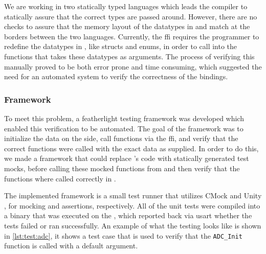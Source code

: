 We are working in two statically typed languages which leads the compiler to statically assure that the correct types are passed around.
However, there are no checks to assure that the memory layout of the datatypes in {\C} and {\rust} match at the borders between the two languages.
Currently, the {\rust} \gls{ffi} requires the programmer to redefine the {\C} datatypes in {\rust}, like structs and enums, in order to call into the {\C} functions that takes these datatypes as arguments.
The process of verifying this manually proved to be both error prone and time consuming, which suggested the need for an automated system to verify the correctness of the bindings.

\subsubsection{Framework}

To meet this problem, a featherlight testing framework was developed which enabled this verification to be automated.
The goal of the framework was to initialize the data on the {\rust} side, call functions via the \gls{ffi}, and verify that the correct functions were called with the exact data as supplied.
In order to do this, we made a framework that could replace {\emlib}'s code with statically generated test mocks, before calling these mocked functions from {\rust} and then verify that the functions where called correctly in {\C}.

The implemented framework is a small test runner that utilizes CMock \cite{web:cmock} and Unity \cite{web:unity}, for mocking and assertions, respectively.
All of the unit tests were compiled into a binary that was executed on the {\gecko}, which reported back via \gls{usart} whether the tests failed or ran successfully.
An example of what the testing looks like is shown in \autoref{lst:test:adc}, it shows a test case that is used to verify that the \texttt{ADC\_Init} function is called with a default argument.


